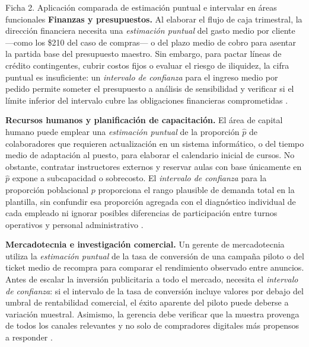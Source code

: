 {
\begin{fichainvestigacion}{Ficha 2. Aplicación comparada de estimación puntual e intervalar en áreas funcionales}
\textbf{Finanzas y presupuestos.} Al elaborar el flujo de caja trimestral, la dirección financiera necesita una \textit{estimación puntual} del gasto medio por cliente —como los \$210 del caso de compras— o del plazo medio de cobro para asentar la partida base del presupuesto maestro. Sin embargo, para pactar líneas de crédito contingentes, cubrir costos fijos o evaluar el riesgo de iliquidez, la cifra puntual es insuficiente: un \textit{intervalo de confianza} para el ingreso medio por pedido permite someter el presupuesto a análisis de sensibilidad y verificar si el límite inferior del intervalo cubre las obligaciones financieras comprometidas \citep{holmesBusiness2023}.

\textbf{Recursos humanos y planificación de capacitación.} El área de capital humano puede emplear una \textit{estimación puntual} de la proporción $\hat{p}$ de colaboradores que requieren actualización en un sistema informático, o del tiempo medio de adaptación al puesto, para elaborar el calendario inicial de cursos. No obstante, contratar instructores externos y reservar aulas con base únicamente en $\hat{p}$ expone a subcapacidad o sobrecosto. El \textit{intervalo de confianza} para la proporción poblacional $p$ proporciona el rango plausible de demanda total en la plantilla, sin confundir esa proporción agregada con el diagnóstico individual de cada empleado ni ignorar posibles diferencias de participación entre turnos operativos y personal administrativo \citep{holmesBusiness2023,bradley2021}.

\textbf{Mercadotecnia e investigación comercial.} Un gerente de mercadotecnia utiliza la \textit{estimación puntual} de la tasa de conversión de una campaña piloto o del ticket medio de recompra para comparar el rendimiento observado entre anuncios. Antes de escalar la inversión publicitaria a todo el mercado, necesita el \textit{intervalo de confianza}: si el intervalo de la tasa de conversión incluye valores por debajo del umbral de rentabilidad comercial, el éxito aparente del piloto puede deberse a variación muestral. Asimismo, la gerencia debe verificar que la muestra provenga de todos los canales relevantes y no solo de compradores digitales más propensos a responder \citep{bradley2021}.
\end{fichainvestigacion}

}
